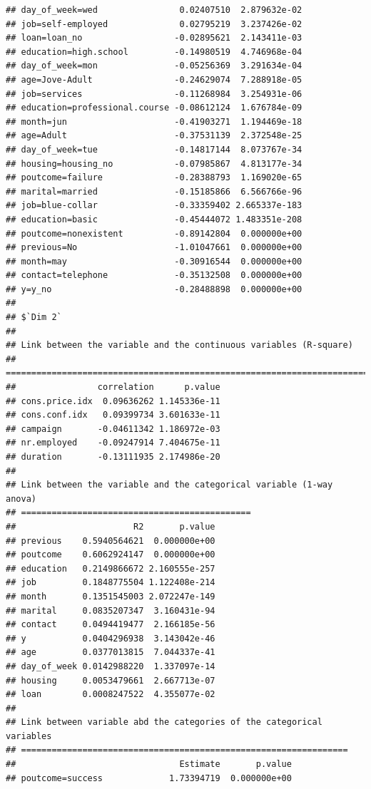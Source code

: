 \documentclass[
]{article}
\begin{document}
\begin{verbatim}
## day_of_week=wed                0.02407510  2.879632e-02
## job=self-employed              0.02795219  3.237426e-02
## loan=loan_no                  -0.02895621  2.143411e-03
## education=high.school         -0.14980519  4.746968e-04
## day_of_week=mon               -0.05256369  3.291634e-04
## age=Jove-Adult                -0.24629074  7.288918e-05
## job=services                  -0.11268984  3.254931e-06
## education=professional.course -0.08612124  1.676784e-09
## month=jun                     -0.41903271  1.194469e-18
## age=Adult                     -0.37531139  2.372548e-25
## day_of_week=tue               -0.14817144  8.073767e-34
## housing=housing_no            -0.07985867  4.813177e-34
## poutcome=failure              -0.28388793  1.169020e-65
## marital=married               -0.15185866  6.566766e-96
## job=blue-collar               -0.33359402 2.665337e-183
## education=basic               -0.45444072 1.483351e-208
## poutcome=nonexistent          -0.89142804  0.000000e+00
## previous=No                   -1.01047661  0.000000e+00
## month=may                     -0.30916544  0.000000e+00
## contact=telephone             -0.35132508  0.000000e+00
## y=y_no                        -0.28488898  0.000000e+00
## 
## $`Dim 2`
## 
## Link between the variable and the continuous variables (R-square)
## =================================================================================
##                correlation      p.value
## cons.price.idx  0.09636262 1.145336e-11
## cons.conf.idx   0.09399734 3.601633e-11
## campaign       -0.04611342 1.186972e-03
## nr.employed    -0.09247914 7.404675e-11
## duration       -0.13111935 2.174986e-20
## 
## Link between the variable and the categorical variable (1-way anova)
## =============================================
##                       R2       p.value
## previous    0.5940564621  0.000000e+00
## poutcome    0.6062924147  0.000000e+00
## education   0.2149866672 2.160555e-257
## job         0.1848775504 1.122408e-214
## month       0.1351545003 2.072247e-149
## marital     0.0835207347  3.160431e-94
## contact     0.0494419477  2.166185e-56
## y           0.0404296938  3.143042e-46
## age         0.0377013815  7.044337e-41
## day_of_week 0.0142988220  1.337097e-14
## housing     0.0053479661  2.667713e-07
## loan        0.0008247522  4.355077e-02
## 
## Link between variable abd the categories of the categorical variables
## ================================================================
##                                Estimate       p.value
## poutcome=success             1.73394719  0.000000e+00

\end{verbatim}
\end{document}
